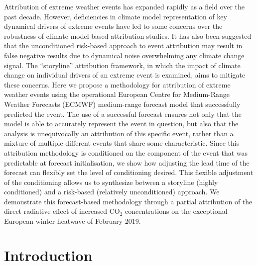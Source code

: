   Attribution of extreme weather events has expanded rapidly as a field over the past decade. However, deficiencies in climate model representation of key dynamical drivers of extreme events have led to some concerns over the robustness of climate model-based attribution studies. It has also been suggested that the unconditioned risk-based approach to event attribution may result in false negative results due to dynamical noise overwhelming any climate change signal. The “storyline” attribution framework, in which the impact of climate change on individual drivers of an extreme event is examined, aims to mitigate these concerns. Here we propose a methodology for attribution of extreme weather events using the operational European Centre for Medium-Range Weather Forecasts (ECMWF) medium-range forecast model that successfully predicted the event. The use of a successful forecast ensures not only that the model is able to accurately represent the event in question, but also that the analysis is unequivocally an attribution of this specific event, rather than a mixture of multiple different events that share some characteristic. Since this attribution methodology is conditioned on the component of the event that was predictable at forecast initialisation, we show how adjusting the lead time of the forecast can flexibly set the level of conditioning desired. This flexible adjustment of the conditioning allows us to synthesize between a storyline (highly conditioned) and a risk-based (relatively unconditioned) approach. We demonstrate this forecast-based methodology through a partial attribution of the direct radiative effect of increased CO$_2$ concentrations on the exceptional European winter heatwave of February 2019.

\section{Introduction}\label{ch3:intro}

